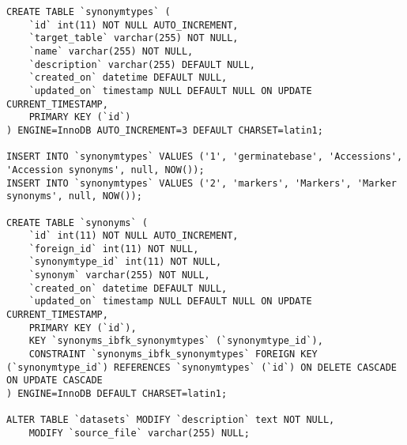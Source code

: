 \begin{itemize}
\begin{lstlisting}[style=SQL]
CREATE TABLE `synonymtypes` (
	`id` int(11) NOT NULL AUTO_INCREMENT,
	`target_table` varchar(255) NOT NULL,
	`name` varchar(255) NOT NULL,
	`description` varchar(255) DEFAULT NULL,
	`created_on` datetime DEFAULT NULL,
	`updated_on` timestamp NULL DEFAULT NULL ON UPDATE CURRENT_TIMESTAMP,
	PRIMARY KEY (`id`)
) ENGINE=InnoDB AUTO_INCREMENT=3 DEFAULT CHARSET=latin1;

INSERT INTO `synonymtypes` VALUES ('1', 'germinatebase', 'Accessions', 'Accession synonyms', null, NOW());
INSERT INTO `synonymtypes` VALUES ('2', 'markers', 'Markers', 'Marker synonyms', null, NOW());

CREATE TABLE `synonyms` (
	`id` int(11) NOT NULL AUTO_INCREMENT,
	`foreign_id` int(11) NOT NULL,
	`synonymtype_id` int(11) NOT NULL,
	`synonym` varchar(255) NOT NULL,
	`created_on` datetime DEFAULT NULL,
	`updated_on` timestamp NULL DEFAULT NULL ON UPDATE CURRENT_TIMESTAMP,
	PRIMARY KEY (`id`),
	KEY `synonyms_ibfk_synonymtypes` (`synonymtype_id`),
	CONSTRAINT `synonyms_ibfk_synonymtypes` FOREIGN KEY (`synonymtype_id`) REFERENCES `synonymtypes` (`id`) ON DELETE CASCADE ON UPDATE CASCADE
) ENGINE=InnoDB DEFAULT CHARSET=latin1;

ALTER TABLE `datasets` MODIFY `description` text NOT NULL,
	MODIFY `source_file` varchar(255) NULL;

	\end{lstlisting}
\end{itemize}